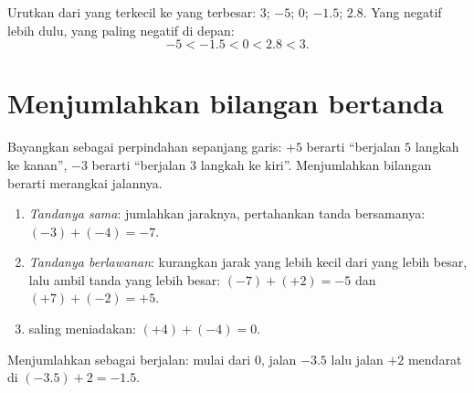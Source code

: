 \begin{example}\label{ex:g7:negatives:compare}
Urutkan dari yang terkecil ke yang terbesar: $3$; $-5$; $0$; $-1.5$;
$2.8$. Yang negatif lebih dulu, yang paling negatif di depan:
\[
-5 < -1.5 < 0 < 2.8 < 3 .
\]
\end{example}

\section{Menjumlahkan bilangan bertanda}

Bayangkan  sebagai perpindahan sepanjang garis: $+5$
berarti ``berjalan $5$ langkah ke kanan'', $-3$ berarti ``berjalan $3$
langkah ke kiri''. Menjumlahkan bilangan berarti merangkai jalannya.

\begin{method}\label{met:g7:negatives:add}
\begin{enumerate}
  \item \emph{Tandanya sama}: jumlahkan jaraknya, pertahankan tanda
        bersamanya: $(-3) + (-4) = -7$.
  \item \emph{Tandanya berlawanan}: kurangkan jarak yang lebih kecil
        dari yang lebih besar, lalu ambil tanda yang lebih besar:
        $(-7) + (+2) = -5$ dan $(+7) + (-2) = +5$.
  \item {} saling meniadakan: $(+4) + (-4) = 0$.
\end{enumerate}
\end{method}

\begin{omfigure}

{\small Menjumlahkan sebagai berjalan: mulai dari $0$, jalan $-3.5$
lalu jalan $+2$ mendarat di $(-3.5) + 2 = -1.5$.}
\end{omfigure}

